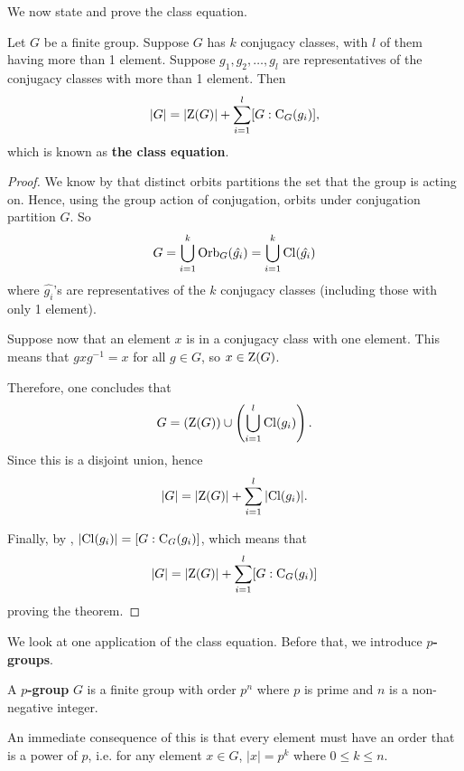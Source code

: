 We now state and prove the class equation.
\begin{theorem}\label{thrm-class-equation}
    Let $G$ be a finite group. Suppose $G$ has $k$ conjugacy classes, with $l$ of them having more than 1 element. Suppose $g_1, g_2, \dots, g_l$ are representatives of the conjugacy classes with more than 1 element. Then
    \[
        |G| = |\mathrm{Z}(G)| + \sum_{i=1}^l [G : \mathrm{C}_{G}(g_i)],
    \]
    which is known as \textbf{the class equation}.
\end{theorem}

\begin{proof}
    We know by  that distinct orbits partitions the set that the group is acting on. Hence, using the group action of conjugation, orbits under conjugation partition $G$. So
    \[
        G = \bigcup_{i=1}^k \mathrm{Orb}_{G}(\hat{g_i}) = \bigcup_{i=1}^k \mathrm{Cl}(\hat{g_i})
    \]
    where $\hat{g_i}$'s are representatives of the $k$ conjugacy classes (including those with only 1 element).

    Suppose now that an element $x$ is in a conjugacy class with one element. This means that $gxg^{-1} = x$ for all $g \in G$, so $x \in \mathrm{Z}(G)$.

    Therefore, one concludes that
    \[
        G = \left(\mathrm{Z}(G)\right) \cup \left(\bigcup_{i=1}^l \mathrm{Cl}(g_i)\right).
    \]
    Since this is a disjoint union, hence
    \[
        |G| = |\mathrm{Z}(G)| + \sum_{i=1}^l |\mathrm{Cl}(g_i)|.
    \]

    Finally, by , $|\mathrm{Cl}(g_i)| = [G : \mathrm{C}_{G}(g_i)]$, which means that
    \[
        |G| = |\mathrm{Z}(G)| + \sum_{i=1}^l [G:\mathrm{C}_{G}(g_i)]
    \]
    proving the theorem.
\end{proof}

We look at one application of the class equation. Before that, we introduce \textbf{$p$-groups}.
\begin{definition}
    A \textbf{$p$-group} $G$ is a finite group with order $p^n$ where $p$ is prime and $n$ is a non-negative integer.
\end{definition}
An immediate consequence of this is that every element must have an order that is a power of $p$, i.e. for any element $x \in G$, $|x| = p^k$ where $0 \leq k \leq n$.

